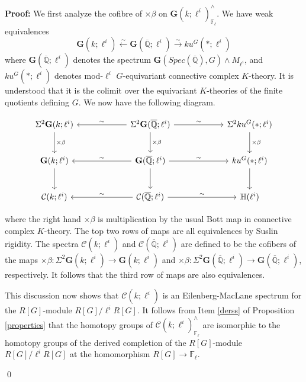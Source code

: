 \documentclass[11pt]{article}
\newcommand\mb{\mathbb}
\newcommand\mc{\mathcal}
\newcommand\mfk{\mathbf G}
\newenvironment{Proof}{\par\noindent\textbf{Proof:}}
{\qed}
\begin{document}
\begin{Proof}
We first analyze the cofibre of $\times \beta$ on $\mfk(k;\ell ^i)^{\wedge}_{\mb{F}_{\ell}}$. We have  weak equivalences 
\begin{equation} \label{bottequiv} \mfk(k; \ell ^i )\overset{\sim}{\leftarrow} \mfk(\overline{\mb{Q}}; \ell ^i )\overset{\sim}{\rightarrow}
ku^G(*; \ell ^i)
\end{equation}
where $\mfk(\overline{\mb{Q}}; \ell ^i) $ denotes the spectrum $\mfk(Spec(\overline{\mb{Q}}), G) \wedge M_{\ell^i}$, and $ku^{G}(*; \ell ^i)$
denotes mod-$\ell ^i$ $G$-equivariant connective complex $K$-theory.  It is  understood that it is the colimit over the equivariant $K$-theories of the finite quotients defining $G$.  We now have the following diagram.  
 \begin{center} \vspace{-1cm}
\begin{equation} 
\begin{tikzcd}[row sep=2.5em, column sep=6em]
\Sigma ^2 \mfk(k; \ell ^i) \arrow[d,"\times \beta"]
& \Sigma ^2\mfk(\overline{\mb{Q}}; \ell ^i) \arrow[d,"\times \beta"] \arrow[r,"\sim"] \arrow[l, "\sim" above] &\Sigma ^2 ku^G(*; \ell ^i)\arrow[d,"\times \beta"]
 \\
 \mfk(k; \ell ^i) \arrow[d]
&   \mfk(\overline{\mb{Q}}; \ell ^i) \arrow[r,"\sim"] \arrow[l,"\sim" above] \arrow[d] & ku^G(*; \ell ^i) \arrow[d]\\
\mc{C}  {(k; \ell ^i)} & \mc{C} (\overline{\mb{Q}};\ell ^i)\arrow[l,"\sim" above] \arrow[r,"\sim"] & \mb{H}(\ell ^i)
\end{tikzcd}
\end{equation}
\end{center}
where the right hand $\times \beta $ is multiplication by the usual Bott map in connective complex $K$-theory.  The top two rows of maps are all equivalences by Suslin rigidity.  The spectra 
$\mc{C} {(k; \ell ^i)} $ and $\mc{C}(\overline{\mb{Q}};\ell ^i)$ are defined to be the cofibers of the maps $\times \beta:\Sigma ^2 \mfk(k; \ell ^i) \rightarrow \mfk(k; \ell ^i) $ and $\times \beta: \Sigma ^2 \mfk(\overline{\mb{Q}}; \ell ^i) \rightarrow \mfk(\overline{\mb{Q}}; \ell ^i)$, respectively.  It follows that the third row of maps are also equivalences.  

This discussion now shows that $\mc{C}(k; \ell ^i ) $ is an  Eilenberg-MacLane spectrum for the $R[G]$-module $R[G]/\ell ^i R[G]$.  It follows from Item \ref{derss} of Proposition \ref{properties} that the homotopy groups of $\mc{C} (k; \ell ^i)^{\wedge}_{\mb{F}_{\ell}}$ are isomorphic to the homotopy groups of the derived completion of the $R[G]$-module $R[G]/\ell ^i R[G]$ at the homomorphism $R[G] \rightarrow \mb{F}_{\ell }$. 


\end{Proof}
\end{document}
